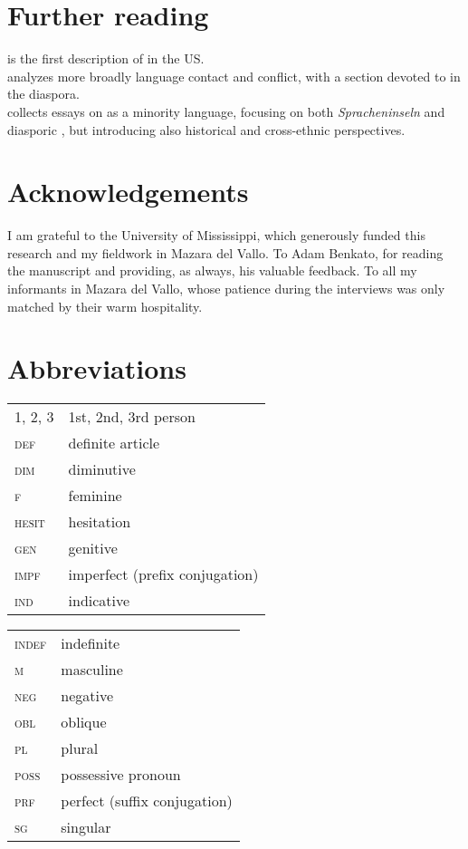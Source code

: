 \documentclass[output=paper]{langsci/langscibook}
\begin{document}
\section*{Further reading}

 \citet{Rouchdy_arabic_1992} is the first description of  in the US.\\
 \citet{Rouchdy2002} analyzes more broadly language contact and conflict, with a section devoted to  in the {diaspora}.\\
 \citet{Owens2000editor} collects essays on  as a minority language, {focusing} on both \textit{Spracheninseln} and diasporic , but introducing also historical and cross-ethnic perspectives.
 
 \section*{Acknowledgements}
I am grateful to the University of Mississippi, which generously funded this research and my fieldwork in {Mazara del Vallo}. To Adam Benkato, for reading the manuscript and providing, as always, his valuable feedback. To all my informants in {Mazara del Vallo}, whose patience during the interviews was only matched by their warm hospitality.
 
 \section*{Abbreviations}

\begin{tabularx}{.55\textwidth}{@{}lQ@{}}
\textsc{1, 2, 3} & 1st, 2nd, 3rd person \\
\textsc{def} & {definite} {article} \\
\textsc{dim} & {diminutive} \\
\textsc{f} & feminine \\
\textsc{hesit} & hesitation \\
\textsc{gen} & genitive \\
\textsc{impf} & imperfect (prefix conjugation) \\
\textsc{ind} & indicative \\
\end{tabularx}%
\begin{tabularx}{.5\textwidth}{@{}lQ@{}}
\textsc{indef} & indefinite \\
\textsc{m} & masculine \\
\textsc{neg} & negative \\
\textsc{obl} & oblique \\
\textsc{pl} & plural \\
\textsc{poss} & possessive pronoun \\
\textsc{prf} & perfect (suffix conjugation) \\
\textsc{sg} & singular \\
\end{tabularx}%


\sloppy\printbibliography[heading=subbibliography,notkeyword=this]
\end{document}
